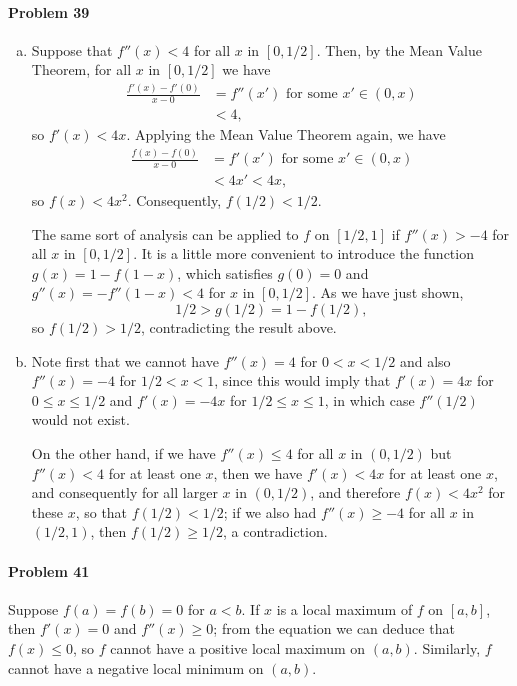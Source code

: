 \documentclass{article}
\begin{document}
\paragraph{Problem 39}
\begin{enumerate}[(a)]
  \item Suppose that $f''(x) < 4$ for all $x$ in $[0, 1/2]$. Then, by the Mean
    Value Theorem, for all $x$ in $[0, 1/2]$ we have
    \begin{align*}
      \frac{f'(x) - f'(0)}{x - 0}
      &= f''(x') \text{ for some } x' \in (0, x) \\
      &< 4,
    \end{align*}
    so $f'(x) < 4x$. Applying the Mean Value Theorem again, we have
    \begin{align*}
      \frac{f(x) - f(0)}{x - 0}
      &= f'(x') \text{ for some } x' \in (0, x) \\
      &< 4x' < 4x,
    \end{align*}
    so $f(x) < 4x^2$. Consequently, $f(1/2) < 1/2$.

    The same sort of analysis can be applied to $f$ on $[1/2, 1]$ if $f''(x) >
    -4$ for all $x$ in $[0, 1/2]$. It is a little more convenient to introduce
    the function $g(x) = 1 - f(1 - x)$, which satisfies $g(0) = 0$ and $g''(x)
    = -f''(1 - x) < 4$ for $x$ in $[0, 1/2]$. As we have just shown, \[
      1/2 > g(1/2) = 1 - f(1/2),
    \] so $f(1/2) > 1/2$, contradicting the result above.
  \item Note first that we cannot have $f''(x) = 4$ for $0 < x < 1/2$ and also
    $f''(x) = -4$ for $1/2 < x < 1$, since this would imply that $f'(x) = 4x$
    for $0 \leq x \leq 1/2$ and $f'(x) = -4x$ for $1/2 \leq x \leq 1$, in which
    case $f''(1/2)$ would not exist.

    On the other hand, if we have $f''(x) \leq 4$ for all $x$ in $(0, 1/2)$ but
    $f''(x) < 4$ for at least one $x$, then we have $f'(x) < 4x$ for at least
    one $x$, and consequently for all larger $x$ in $(0, 1/2)$, and therefore
    $f(x) < 4x^2$ for these $x$, so that $f(1/2) < 1/2$; if we also had $f''(x)
    \geq -4$ for all $x$ in $(1/2, 1)$, then $f(1/2) \geq 1/2$, a
    contradiction.
\end{enumerate}

\paragraph{Problem 41} Suppose $f(a) = f(b) = 0$ for $a < b$. If $x$ is a local
maximum of $f$ on $[a, b]$, then $f'(x) = 0$ and $f''(x) \geq 0$; from the
equation we can deduce that $f(x) \leq 0$, so $f$ cannot have a positive local
maximum on $(a, b)$. Similarly, $f$ cannot have a negative local minimum on
$(a, b)$.
\end{document}
